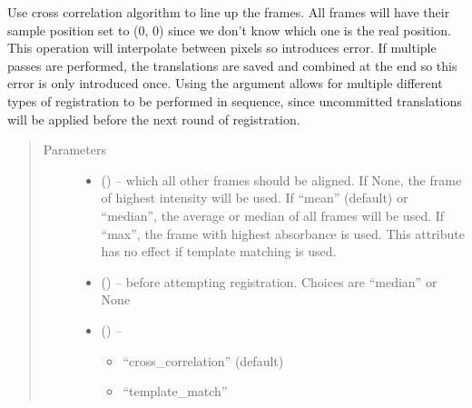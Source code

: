 \documentclass[letterpaper,10pt,english]{sphinxmanual}
\begin{document}
\begin{fulllineitems}
\begin{fulllineitems}
\label{\detokenize{xanespy:xanespy.xanes_frameset.XanesFrameset.align_frames}}
Use cross correlation algorithm to line up the frames. All frames
will have their sample position set to (0, 0) since we don't
know which one is the real position. This operation will
interpolate between pixels so introduces error. If multiple
passes are performed, the translations are saved and combined
at the end so this error is only introduced once. Using the
 argument allows for multiple different types of
registration to be performed in sequence, since uncommitted
translations will be applied before the next round of
registration.
\begin{quote}\begin{description}
\item[{Parameters}] \leavevmode\begin{itemize}
\item {} 
\sphinxstyleliteralstrong{}\sphinxstyleliteralstrong{(}\sphinxstyleliteralstrong{, }\sphinxstyleliteralstrong{)}\sphinxstyleliteralstrong{} () -- which all other frames should be aligned. If None, the frame
of highest intensity will be used. If ``mean'' (default) or
``median'', the average or median of all frames will be
used. If ``max'', the frame with highest absorbance is
used. This attribute has no effect if template matching is
used.

\item {} 
 () -- before attempting registration. Choices are ``median'' or None

\item {} 
 () -- \begin{itemize}
\item {} 
``cross\_correlation'' (default)

\item {} 
``template\_match''


\end{itemize}
\end{itemize}
\end{description}
\end{quote}
\end{fulllineitems}
\end{fulllineitems}
\end{document}
